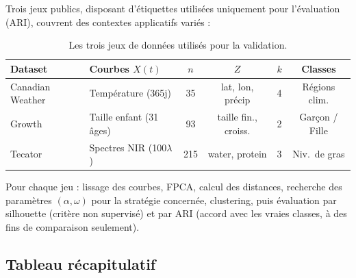 \documentclass[11pt, a4paper]{article}
\begin{document}
Trois jeux publics, disposant d'étiquettes utilisées uniquement pour
l'évaluation (ARI), couvrent des contextes applicatifs variés :

\begin{table}[H]
\centering
\renewcommand{\arraystretch}{1.2}
\begin{tabular}{llcccc}
  \toprule
  \textbf{Dataset} & \textbf{Courbes $X(t)$} & $n$ & \textbf{$Z$} & $k$ & \textbf{Classes} \\
  \midrule
  Canadian Weather & Température (365j) & 35 & lat, lon, précip & 4 & Régions clim. \\
  Growth & Taille enfant (31 âges) & 93 & taille fin., croiss. & 2 & Garçon / Fille \\
  Tecator & Spectres NIR (100$\lambda$) & 215 & water, protein & 3 & Niv.\ de gras \\
  \bottomrule
\end{tabular}
\caption{Les trois jeux de données utilisés pour la validation.}
\end{table}

Pour chaque jeu : lissage des courbes, FPCA, calcul des distances, recherche
des paramètres $(\alpha, \omega)$ pour la stratégie concernée, clustering,
puis évaluation par silhouette (critère non supervisé) et par ARI (accord avec
les vraies classes, à des fins de comparaison seulement).

\subsection{Tableau récapitulatif}
\end{document}

